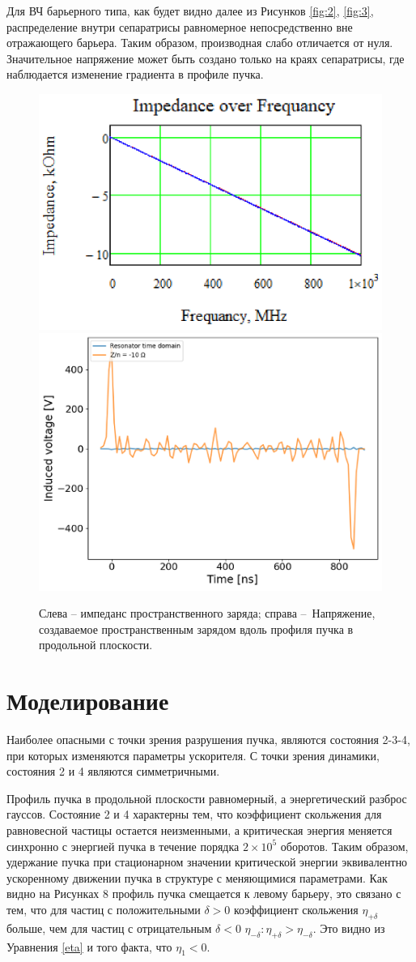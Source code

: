 \documentclass[a4paper,
               keeplastbox,   %
               ]{jacow}
\begin{document}
\par Для ВЧ барьерного типа, как будет видно далее из Рисунков \ref{fig:2}, \ref{fig:3}, распределение внутри сепаратрисы равномерное непосредственно вне отражающего барьера. Таким образом, производная слабо отличается от нуля. Значительное напряжение может быть создано только на краях сепаратрисы, где наблюдается изменение градиента в профиле пучка.


\begin{figure}[!htb]
   \includegraphics*[width=.51\columnwidth]{img/fig_06-1}
   \includegraphics*[width=.48\columnwidth]{img/fig_07-1}
   \caption{Слева – импеданс пространственного заряда; справа – Напряжение, создаваемое пространственным 
   зарядом вдоль профиля пучка в продольной плоскости. }
   \label{fig:signal}
\end{figure}

\section{Моделирование}

\par Наиболее опасными с точки зрения разрушения пучка, являются состояния 2-3-4, при которых изменяются параметры ускорителя. С точки зрения динамики, состояния 2 и 4 являются симметричными.
\par Профиль пучка в продольной плоскости равномерный, а энергетический разброс гауссов. Состояние 2 и 4 характерны тем, что коэффициент скольжения для равновесной частицы остается неизменными, а критическая энергия меняется синхронно с энергией пучка в течение порядка $2\times{10}^5$ оборотов. Таким образом, удержание пучка при стационарном значении критической энергии эквивалентно ускоренному движении пучка в структуре с меняющимися параметрами. Как видно на Рисунках 8 профиль пучка смещается к левому барьеру, это связано с тем, что для частиц с положительными $\delta>0$ коэффициент скольжения $\eta_{+\delta}$ больше, чем для частиц с отрицательным $\delta<0$ $\eta_{-\delta}: \eta_{+\delta}>\eta_{-\delta}$. Это видно из Уравнения \ref{eta} и того факта, что $\eta_1<0$. 
\end{document}
